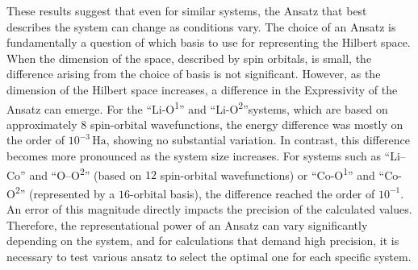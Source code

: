 \documentclass[pdflatex,sn-mathphys-num]{sn-jnl}%
\theoremstyle{thmstyleone}%
\theoremstyle{thmstyletwo}%
\theoremstyle{thmstylethree}%
\begin{document}
These results suggest that even for similar systems, the Ansatz that best describes the system can change as conditions vary. The choice of an Ansatz is fundamentally a question of which basis to use for representing the Hilbert space. When the dimension of the space, described by spin orbitals, is small, the difference arising from the choice of basis is not significant. However, as the dimension of the Hilbert space increases, a difference in the Expressivity of the Ansatz can emerge. For the ``Li-O\textsuperscript{1}'' and ``Li-O\textsuperscript{2}''systems, which are based on approximately $8$ spin-orbital wavefunctions, the energy difference was mostly on the order of \(10^{-3}\,\mathrm{Ha}\), showing no substantial variation. In contrast, this difference becomes more pronounced as the system size increases. For systems such as ``Li--Co'' and ``O--O\textsuperscript{2}'' (based on $12$ spin-orbital wavefunctions) or ``Co-O\textsuperscript{1}'' and ``Co-O\textsuperscript{2}'' (represented by a $16$-orbital basis), the difference reached the order of \(10^{-1}\). An error of this magnitude directly impacts the precision of the calculated values. Therefore, the representational power of an Ansatz can vary significantly depending on the system, and for calculations that demand high precision, it is necessary to test various ansatz to select the optimal one for each specific system.

\newpage
\end{document}
